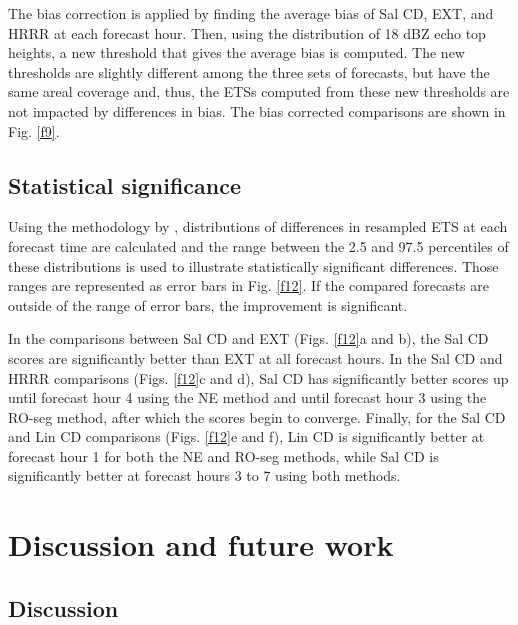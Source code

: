 \documentclass[12pt]{article}
\begin{document}
The bias correction is applied by finding the average bias of Sal CD, EXT, and HRRR at each forecast hour. Then, using the distribution of 18 dBZ echo top heights, a new threshold that gives the average bias is computed. The new thresholds are slightly different among the three sets of forecasts, but have the same areal coverage and, thus, the ETSs computed from these new thresholds are not impacted by differences in bias. The bias corrected comparisons are shown in Fig. \ref{f9}. 
 
\subsection{Statistical significance}
Using the methodology by \citealt{hamill99}, distributions of differences in resampled ETS at each forecast time are calculated and the range between the 2.5 and 97.5 percentiles of these distributions is used to illustrate statistically significant differences. Those ranges are represented as error bars in Fig. \ref{f12}. If the compared forecasts are outside of the range of error bars, the improvement is significant.

In the comparisons between Sal CD and EXT (Figs. \ref{f12}a and b), the Sal CD scores are significantly better than EXT at all forecast hours. In the Sal CD and HRRR comparisons (Figs. \ref{f12}c and d), Sal CD has significantly better scores up until forecast hour 4 using the NE method and until forecast hour 3 using the RO-seg method, after which the scores begin to converge. Finally, for the Sal CD and Lin CD comparisons (Figs. \ref{f12}e and f), Lin CD is significantly better at forecast hour 1 for both the NE and RO-seg methods, while Sal CD is significantly better at forecast hours 3 to 7 using both methods.

\section{Discussion and future work}
\subsection{Discussion}
\end{document}
